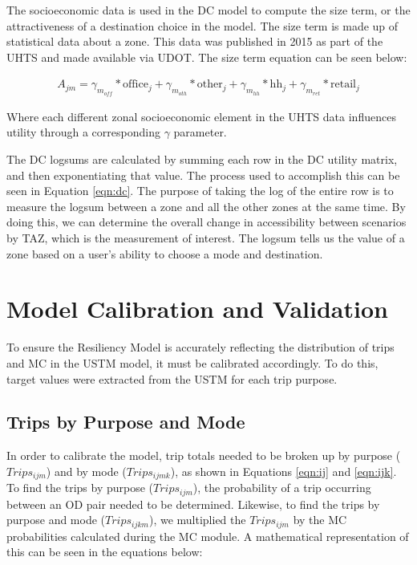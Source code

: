 The socioeconomic data is used in the DC model to compute the size term, or
the attractiveness of
a destination choice in the model. The size term is made up of statistical
data about a zone.
This data was published in 2015 as part of the UHTS and made available via
UDOT.  The size term
equation can be seen below:

\begin{equation}
\begin{aligned}
	A_{jm} = \gamma_{m_{off}} * \mathrm{office}_j + \gamma_{m_{oth}} * \mathrm{other}_j + \gamma_{m_{hh}} * \mathrm{hh}_j + \gamma_{m_{ret}} * \mathrm{retail}_j
	\label{eqn:sizeterm}
\end{aligned}
\end{equation}

\noindent Where each different zonal socioeconomic element in the UHTS data influences
utility through a corresponding $\gamma$ parameter.

The DC logsums are calculated by summing each row in the DC utility matrix,
and then
exponentiating that value. The process used to accomplish this can be seen
in Equation \ref{eqn:dc}.
The purpose of taking the log of the entire row is to measure the logsum
between a zone and all
the other zones at the same time. By doing this, we can determine the overall
change in accessibility
between scenarios by TAZ, which is the measurement of interest. The logsum
tells us the value of
a zone based on a user’s ability to choose a mode and destination.

\section{Model Calibration and Validation}

To ensure the Resiliency Model is accurately reflecting the distribution
of trips and MC in the USTM model, it must be
calibrated accordingly. To do this, target values were extracted from the
USTM for each trip purpose.

\subsection{Trips by Purpose and Mode}

In order to calibrate the model, trip totals needed to be broken up by purpose
(\(Trips_{ijm}\)) and by mode (\(Trips_{ijmk}\)), as shown in Equations
\ref{eqn:ij} and \ref{eqn:ijk}. To find the trips by purpose
(\(Trips_{ijm}\)), the probability of a trip occurring between an OD pair needed to
be determined. Likewise, to find the trips by purpose and mode (\(Trips_{ijkm}\)),
we multiplied the \(Trips_{ijm}\) by the MC probabilities calculated during the MC
module. A mathematical representation of this can be seen in the equations
below:

